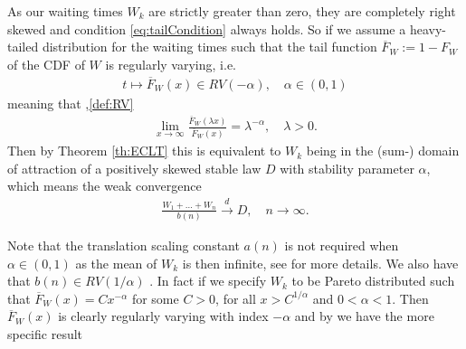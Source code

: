 \documentclass[honours,12pt]{unswthesis}
\newcommand{\1}{\mathbf 1}
\numberwithin{equation}{section}
\theoremstyle{definition}
\theoremstyle{remark}
\begin{document}
As our waiting times $W_k$ are strictly greater than zero, they are completely right skewed and condition \ref{eq:tailCondition} always holds. So if we assume a heavy-tailed distribution for the waiting times such that the tail function 
$\overline F_W := 1 - F_W$ of the CDF of $W$ is regularly varying, i.e.
\begin{align}
t \mapsto \overline F_W(x) \in RV(-\alpha), \quad \alpha \in (0,1)
\end{align}
meaning that \cite{seneta,thebook},\ref{def:RV}
\begin{align*}
\lim_{x \to \infty}\frac{\overline F_W(\lambda x)}{\overline F_W(x)}
= \lambda^{-\alpha}, \quad \lambda > 0.
\end{align*}
Then by Theorem \ref{th:ECLT}
this is equivalent to $W_k$ being in the 
(sum-) domain of attraction of a positively skewed stable law $D$ with 
stability parameter $\alpha$, which means the weak convergence
\begin{align}
\frac{W_1 + \ldots + W_n}{b(n)} \overset{d}{\longrightarrow} D, \quad n \to \infty.
\end{align}

\noindent Note that the translation scaling constant $a(n)$ is not required when $\alpha\in(0,1)$ as the mean of $W_k$ is then infinite, see \cite{Whitt2010} for more details. We also have that $b(n)\in RV(1/\alpha)$ \cite[Prop~4.15]{MeerschaertSikorskii2012}. In fact if we specify $W_k$ to be Pareto distributed such that $\overline F_W(x)=Cx^{-\alpha}$ for some $C>0$, for all $x>C^{1/\alpha}$ and $0<\alpha<1$. Then $\overline F_W(x)$ is clearly regularly varying with index $-\alpha$ and by \cite[Th~3.37]{MeerschaertSikorskii2012} we have the more specific result
\end{document}
